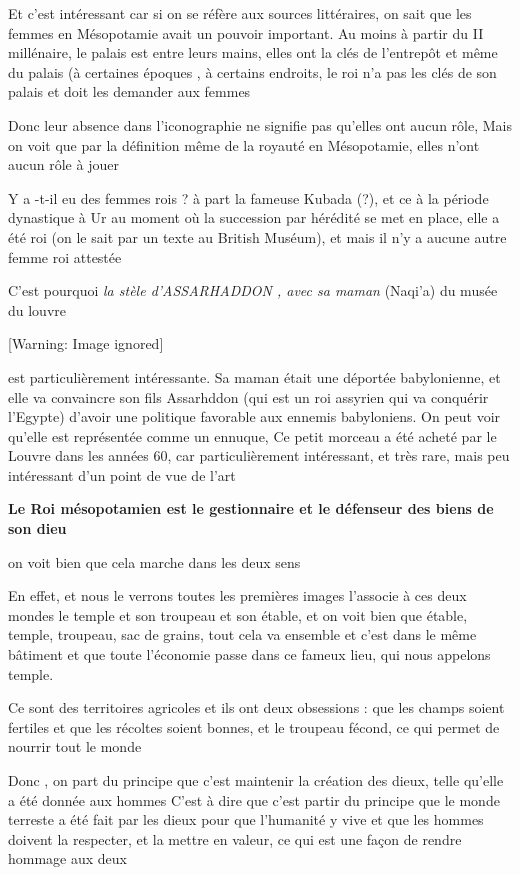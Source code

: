 \documentclass[a4paper,10pt]{article}
\begin{document}
\begin{itemize}
Et c'est intéressant car si on se réfère aux sources
littéraires, on sait que les femmes en Mésopotamie avait un pouvoir
important. Au moins à partir du II millénaire, le palais est entre
leurs mains, elles ont la clés de l'entrepôt et même
du palais (à certaines époques , à certains endroits, le roi
n'a pas les clés de son palais et doit les demander
aux femmes

Donc leur absence dans l'iconographie ne signifie pas
qu'elles ont aucun rôle,  Mais on voit que par la
définition même de la royauté en Mésopotamie, elles
n'ont aucun rôle à jouer

Y a -t-il eu des femmes rois ?  à part la fameuse Kubada (?),  et ce à
la période dynastique à Ur au moment où la succession par hérédité se
met en place, elle a été roi (on le sait par un texte au British
Muséum), et mais il n'y a aucune autre femme roi
attestée

C'est pourquoi \textit{la stèle
d'ASSARHADDON ,  avec sa maman}
(Naqi'a) du musée du louvre 

  [Warning: Image ignored] %
 

est particulièrement intéressante. Sa maman était une déportée
babylonienne, et elle va convaincre son fils Assarhddon (qui est un roi
assyrien qui va conquérir l'Egypte)
d'avoir une politique favorable aux ennemis
babyloniens. On peut voir qu'elle est représentée
comme un ennuque,  Ce petit morceau a été acheté par le Louvre dans les
années 60, car particulièrement intéressant, et très rare, mais peu
intéressant d'un point de vue de
l'art

\textbf{Le Roi mésopotamien est le gestionnaire et le défenseur des
biens de son dieu}

on voit bien que cela marche dans les deux sens

En effet, et nous le verrons toutes les  premières  images
l'associe à ces deux mondes le temple et son troupeau
et son étable,  et on voit bien que étable, temple, troupeau, sac de
grains, tout cela va ensemble et c'est dans le même
bâtiment  et que toute l'économie passe dans ce fameux
lieu, qui nous appelons temple.

Ce sont des territoires agricoles et ils ont deux obsessions  : que les
champs soient fertiles et que les récoltes soient bonnes, et le
troupeau fécond, ce qui permet de nourrir tout le monde

Donc , on part du principe que c'est maintenir la
création des dieux, telle qu'elle a été donnée aux
hommes C'est à dire que c'est partir
du principe que le monde terreste a été fait par les dieux pour que
l'humanité y vive et que les hommes doivent la
respecter, et la mettre en valeur, ce qui est une façon de rendre
hommage aux deux


\end{itemize}
\end{document}
